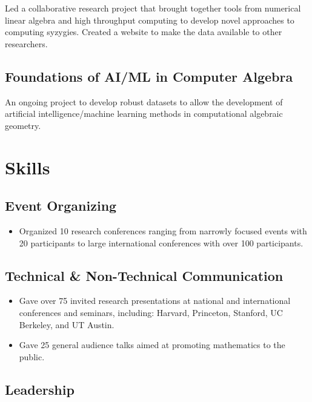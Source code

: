 \documentclass[
	10pt, %
]{FreemanCV}
\begin{document}
\begin{paracol}{2}
Led a collaborative research project that brought together tools from numerical linear algebra and high throughput computing to develop novel approaches to computing syzygies. Created a website to make the data available to other researchers.  %

\subsection{Foundations of AI/ML in Computer Algebra}

An ongoing project to develop robust datasets to allow the development of artificial intelligence/machine learning methods in computational algebraic geometry.  

\section{Skills}

\subsection{Event Organizing}

\begin{itemize}[leftmargin=*]
\item Organized 10 research conferences ranging from narrowly focused events with 20 participants to large international conferences with over 100 participants.
\end{itemize}

\subsection{Technical \& Non-Technical Communication}

\begin{itemize}[leftmargin=*]
\item Gave over 75 invited research presentations at national and international conferences and seminars, including: Harvard, Princeton, Stanford, UC Berkeley, and UT Austin. \vspace{-.4em}
\item Gave 25 general audience talks aimed at promoting mathematics to the public. 
\end{itemize}

\subsection{Leadership}


\end{paracol}
\end{document}
